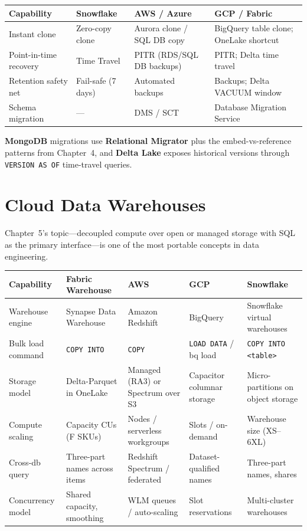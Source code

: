 \begin{center}
\footnotesize
\begin{tabular}{@{}p{2.8cm}p{3.0cm}p{3.0cm}p{3.4cm}@{}}
\toprule
\textbf{Capability} & \textbf{Snowflake} & \textbf{AWS / Azure} & \textbf{GCP / Fabric} \\
\midrule
Instant clone & Zero-copy clone & Aurora clone / SQL DB copy & BigQuery table clone; OneLake shortcut \\
Point-in-time recovery & Time Travel & PITR (RDS/SQL DB backups) & PITR; Delta time travel \\
Retention safety net & Fail-safe (7 days) & Automated backups & Backups; Delta VACUUM window \\
Schema migration & --- & DMS / SCT & Database Migration Service \\
\bottomrule
\end{tabular}
\end{center}

\noindent \textbf{MongoDB} migrations use \textbf{Relational Migrator} plus the embed-vs-reference
patterns from Chapter~4, and \textbf{Delta Lake} exposes historical versions through
\texttt{VERSION AS OF} time-travel queries.

\section{Cloud Data Warehouses}
%
Chapter~5's topic---decoupled compute over open or managed storage with SQL as the primary
interface---is one of the most portable concepts in data engineering.

\begin{center}
\footnotesize
\begin{tabular}{@{}p{2.8cm}p{3.2cm}p{3.2cm}p{3.2cm}p{3.2cm}@{}}
\toprule
\textbf{Capability} & \textbf{Fabric Warehouse} & \textbf{AWS} & \textbf{GCP} & \textbf{Snowflake} \\
\midrule
Warehouse engine & Synapse Data Warehouse & Amazon Redshift & BigQuery & Snowflake virtual warehouses \\
Bulk load command & \texttt{COPY INTO} & \texttt{COPY} & \texttt{LOAD DATA} / bq load & \texttt{COPY INTO <table>} \\
Storage model & Delta-Parquet in OneLake & Managed (RA3) or Spectrum over S3 & Capacitor columnar storage & Micro-partitions on object storage \\
Compute scaling & Capacity CUs (F SKUs) & Nodes / serverless workgroups & Slots / on-demand & Warehouse size (XS--6XL) \\
Cross-db query & Three-part names across items & Redshift Spectrum / federated & Dataset-qualified names & Three-part names, shares \\
Concurrency model & Shared capacity, smoothing & WLM queues / auto-scaling & Slot reservations & Multi-cluster warehouses \\
\bottomrule
\end{tabular}
\end{center}

